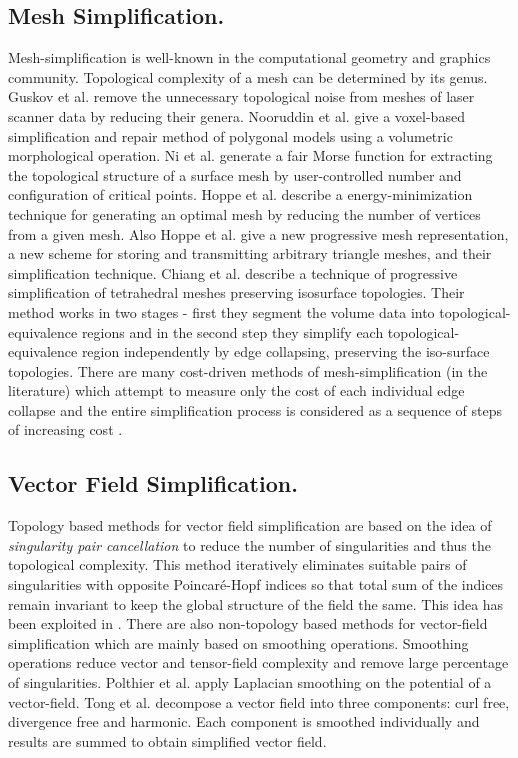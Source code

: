 \documentclass[twocolumn]{article}
\begin{document}
\subsection*{Mesh Simplification.} Mesh-simplification is well-known 
in the computational geometry and graphics community. Topological complexity of a mesh can be
determined by its genus. Guskov et al. \cite{2001-Guskov-topologicalnoise} remove
the unnecessary topological noise from 
meshes of laser scanner data by reducing their genera. 
Nooruddin et al. \cite{2003-Nooruddin-tvcg} give a voxel-based simplification and repair method of polygonal models
using a volumetric morphological operation. Ni et al. \cite{2004-Ni-ATOG}
generate a fair Morse function for extracting the topological
structure of a surface mesh by user-controlled number and
configuration of critical points. Hoppe et al. \cite{1993-Hoppe-mesh-opti} describe
a energy-minimization technique for generating an optimal mesh by
reducing the number of vertices from a given mesh. Also Hoppe et al. \cite{1996-Hoppe-progressive-mesh, 1997-Hoppe-progressive-mesh} give a new progressive mesh
representation, a new scheme for storing and transmitting arbitrary
triangle meshes, and their simplification technique. Chiang et al. \cite{2003-Chiang-Simplification}
describe a technique of progressive simplification of tetrahedral
meshes preserving isosurface topologies. Their method works in two
stages - first they segment the volume data into
topological-equivalence regions and in the second step they simplify
each topological-equivalence region independently by edge collapsing, preserving the
iso-surface topologies. There are many cost-driven methods of mesh-simplification
(in the literature) which attempt to measure only the cost of each individual edge collapse
and the entire simplification process is considered as a sequence of
steps of increasing cost
\cite{1998-Dey-topologypreserving, 1998-LindstromT,
  1999-Lindstrom-Memless, 1997-GarlandH}.


\subsection*{Vector Field Simplification.} Topology based
  methods for vector field simplification are based on the
  idea of \textit{singularity pair cancellation} to reduce the number
  of singularities and thus the topological complexity. This method
  iteratively eliminates suitable pairs of singularities with opposite
  Poincar\'e-Hopf indices so that total sum of the indices remain
  invariant to keep the global structure of the field the same.
  This idea has been exploited in 
  \cite{2001-Tricoche-vec-simpli, 2006-Zhang-vec, 2011-Reininghaus-Visweek}.
There are also non-topology based methods for vector-field
  simplification which are mainly based on
  smoothing operations. Smoothing operations reduce vector and tensor-field
  complexity and remove large percentage of
  singularities. Polthier et al. \cite{2003-Polthier} apply Laplacian 
 smoothing on the potential of a
  vector-field. Tong et al. \cite{2003-Tong} decompose a vector field into three
  components: curl free, divergence free and harmonic. Each component
  is smoothed individually and results are summed to obtain simplified
  vector field.
\end{document}
